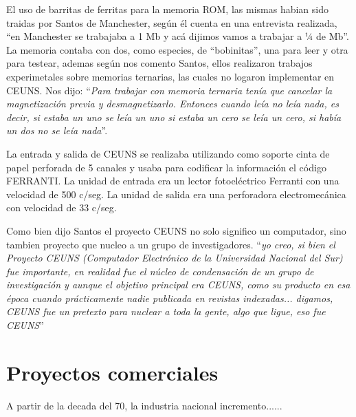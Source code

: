 \documentclass[%
 	final,
%
	notitlepage,
	narroweqnarray,
	inline,
 	twoside,
	]{ieee}
\begin{document}
\begin{description}
\item El uso de barritas de ferritas para la memoria ROM, las mismas habian sido traidas por Santos de Manchester, seg\'un \'el cuenta en una entrevista realizada, “en Manchester se trabajaba a 1 Mb y ac\'a dijimos vamos a trabajar a 1⁄4 de Mb”. La memoria contaba con dos, como especies, de “bobinitas”, una para leer y otra para testear, ademas seg\'un nos comento Santos, ellos realizaron trabajos experimetales sobre memorias ternarias, las cuales no logaron implementar en CEUNS. Nos dijo: ``\textit{Para trabajar con memoria ternaria ten\'ia que cancelar la magnetizaci\'on previa y desmagnetizarlo. Entonces cuando le\'ia no le\'ia nada, es decir, si estaba un uno se le\'ia un uno si estaba un cero se le\'ia un cero, si hab\'ia un dos no se le\'ia nada}''.
\item La entrada y salida de CEUNS se realizaba utilizando como soporte cinta de papel perforada de 5 canales y usaba para codificar la informaci\'on el c\'odigo FERRANTI. La unidad de entrada era un lector fotoel\'ectrico Ferranti con una velocidad de 500 c/seg. La unidad de salida era una perforadora electromec\'anica con velocidad de 33 c/seg.
\end{description}

Como bien dijo Santos el proyecto CEUNS no solo significo un computador, sino tambien proyecto que nucleo a un grupo de investigadores.
``\textit{yo creo, si bien el Proyecto CEUNS (Computador Electr\'onico de la Universidad Nacional del Sur) fue importante, en realidad fue el n\'ucleo de condensaci\'on de un grupo de investigaci\'on y aunque el objetivo principal era CEUNS, como su producto en esa \'epoca cuando pr\'acticamente nadie publicada en revistas indexadas... digamos, CEUNS fue un pretexto para nuclear a toda la gente, algo que ligue, eso fue CEUNS}''

\section{Proyectos comerciales}
A partir de la decada del 70, la industria nacional incremento......
\end{document}
